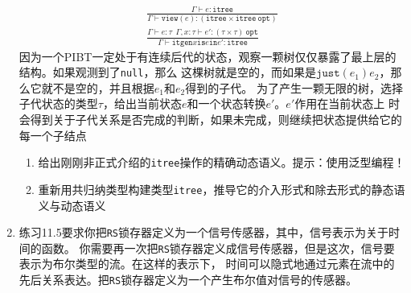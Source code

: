 \begin{enumerate}
\begin{subequations}
		\begin{gather}
		\frac{\Gamma\vdash e:\texttt{itree}}
		{\Gamma\vdash\texttt{view}(e):(\texttt{itree}\times\texttt{itree}\ \texttt{opt})} \\
		\frac{\Gamma\vdash e:\tau\ \ \Gamma,x:\tau\vdash e':(\tau\times\tau)\ \texttt{opt}}
		{\Gamma\vdash\texttt{itgen} x\texttt{is} e\texttt{in} e':\texttt{itree}}
		\end{gather}
	\end{subequations}
	因为一个PIBT一定处于有连续后代的状态，观察一颗树仅仅暴露了最上层的结构。如果观测到了\texttt{null}，那么
	这棵树就是空的，而如果是$\texttt{just}(e_1)e_2$，那么它就不是空的，并且根据$e_1$和$e_2$得到的子代。
	为了产生一颗无限的树，选择子代状态的类型$\tau$，给出当前状态$e$和一个状态转换$e'$。$e'$作用在当前状态上
	时会得到关于子代关系是否完成的判断，如果未完成，则继续把状态提供给它的每一个子结点
	\begin{enumerate}
		\renewcommand{\theenumi}{\alph{enumi}}
		\item 给出刚刚非正式介绍的\texttt{itree}操作的精确动态语义。提示：使用泛型编程！
		\item 重新用共归纳类型构建类型\texttt{itree}，推导它的介入形式和除去形式的静态语义与动态语义
	\end{enumerate}
	\item 练习11.5要求你把\texttt{RS}锁存器定义为一个信号传感器，其中，信号表示为关于时间的函数。
	你需要再一次把\texttt{RS}锁存器定义成信号传感器，但是这次，信号要表示为布尔类型的流。在这样的表示下，
	时间可以隐式地通过元素在流中的先后关系表达。把\texttt{RS}锁存器定义为一个产生布尔值对信号的传感器。
\end{enumerate}

